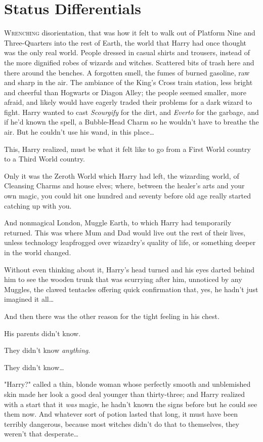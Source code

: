 \chapter{Status Differentials}

\lettrine{W}{renching}
disorientation, that was how it felt to walk out of Platform Nine and
Three-Quarters into the rest of Earth, the world that Harry had once thought
was the only real world. People dressed in casual shirts and trousers, instead of
the more dignified robes of wizards and witches. Scattered bits of trash here
and there around the benches. A forgotten smell, the fumes of burned gasoline,
raw and sharp in the air. The ambiance of the King's Cross train station, less
bright and cheerful than Hogwarts or Diagon Alley; the people seemed smaller,
more afraid, and likely would have eagerly traded their problems for a dark
wizard to fight. Harry wanted to cast \emph{Scourgify} for the dirt, and
\emph{Everto} for the garbage, and if he'd known the spell, a Bubble-Head Charm
so he wouldn't have to breathe the air. But he couldn't use his wand, in this
place{\ldots}

This, Harry realized, must be what it felt like to go from a First World
country to a Third World country.

Only it was the Zeroth World which Harry had left, the wizarding world, of
Cleansing Charms and house elves; where, between the healer's arts and your own
magic, you could hit one hundred and seventy before old age really started
catching up with you.

And nonmagical London, Muggle Earth, to which Harry had temporarily returned.
This was where Mum and Dad would live out the rest of their lives, unless
technology leapfrogged over wizardry's quality of life, or something deeper in
the world changed.

Without even thinking about it, Harry's head turned and his eyes darted behind
him to see the wooden trunk that was scurrying after him, unnoticed by any
Muggles, the clawed tentacles offering quick confirmation that, yes, he hadn't
just imagined it all{\ldots}

And then there was the other reason for the tight feeling in his chest.

His parents didn't know.

They didn't know \emph{anything}.

They didn't know{\ldots}

"Harry?" called a thin, blonde woman whose perfectly smooth and unblemished
skin made her look a good deal younger than thirty-three; and Harry realized
with a start that it \emph{was} magic, he hadn't known the signs before but he
could see them now. And whatever sort of potion lasted that long, it must have
been terribly dangerous, because most witches didn't do that to themselves,
they weren't that desperate{\ldots}

